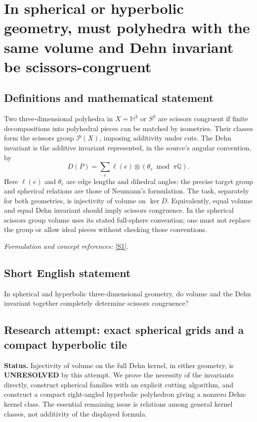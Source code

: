 \documentclass[11pt]{article}
\begin{document}
\section*{\texorpdfstring{In spherical or hyperbolic geometry, must polyhedra with the same volume and Dehn invariant be scissors-congruent}{In spherical or hyperbolic geometry, must polyhedra with the same volume and Dehn invariant be scissors-congruent}}\label{statement}
\subsection{Definitions and mathematical statement}
Two three-dimensional polyhedra in $X=\mathbb H^3$ or $S^3$ are scissors congruent if finite decompositions into polyhedral pieces can be matched by isometries. Their classes form the scissors group $\mathcal P(X)$, imposing additivity under cuts. The Dehn invariant is the additive invariant represented, in the source's angular convention, by
\[
 D(P)=\sum_{e}\ell(e)\otimes(\theta_e\bmod\pi{\mathbb{Q}}).
\]
Here $\ell(e)$ and $\theta_e$ are edge lengths and dihedral angles; the precise target group and spherical relations are those of Neumann's formulation. The task, separately for both geometries, is injectivity of volume on $\ker D$. Equivalently, equal volume and equal Dehn invariant should imply scissors congruence. In the spherical scissors group volume uses its stated full-sphere convention; one must not replace the group or allow ideal pieces without checking those conventions.
\par\smallskip\textit{Formulation and concept references:} \href{https://arxiv.org/pdf/math/9712226}{[S1]}.

\subsection{Short English statement}
In spherical and hyperbolic three-dimensional geometry, do volume and the Dehn invariant together completely determine scissors congruence?
\subsection{Research attempt: exact spherical grids and a compact hyperbolic tile}
\textbf{Status.} Injectivity of volume on the full Dehn kernel, in either geometry, is \textbf{UNRESOLVED} by this attempt. We prove the necessity of the invariants directly, construct spherical families with an explicit cutting algorithm, and construct a compact right-angled hyperbolic polyhedron giving a nonzero Dehn-kernel class. The essential remaining issue is relations among general kernel classes, not additivity of the displayed formula.
\end{document}
